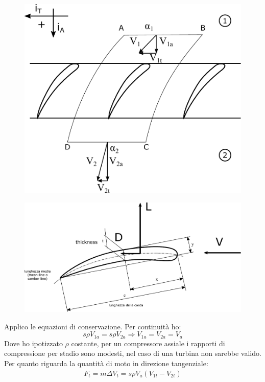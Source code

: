 \begin{figure}[h!]
\centering
\begin{minipage}{.4\textwidth}
  \centering
  \includegraphics[width=.85\linewidth]{fig/schiera1.pdf}
  \label{}
\end{minipage}%
\begin{minipage}{.6\textwidth}
  \centering
  \includegraphics[width=.85\linewidth]{fig/LDref.pdf}
  \label{}
\end{minipage}
\end{figure}
Applico le equazioni di conservazione. Per continuità ho:
\begin{equation}
s \rho V_{1a} = s \rho V_{2a} \Rightarrow V_{1a} = V_{2a} = V_a
\end{equation}
Dove ho ipotizzato $\rho$ costante, per un compressore assiale i rapporti di compressione per stadio sono modesti, nel caso di una turbina non sarebbe valido. Per quanto riguarda la quantità di moto in direzione tangenziale:
\begin{align*}
F_t= \dot{m} \Delta V_t = s \rho	V_a (V_{1t}-V_{2t})
\end{align*}
